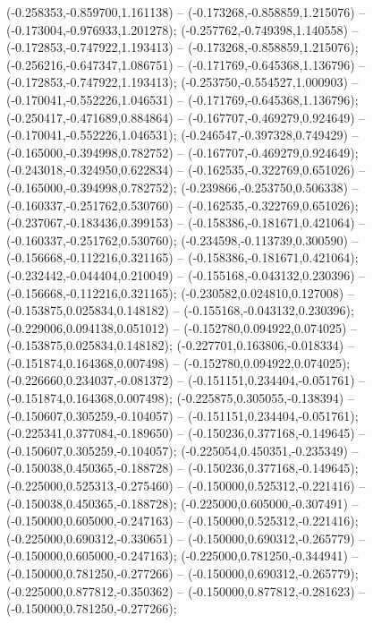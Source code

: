  (-0.258353,-0.859700,1.161138) -- (-0.173268,-0.858859,1.215076) -- (-0.173004,-0.976933,1.201278);
 (-0.257762,-0.749398,1.140558) -- (-0.172853,-0.747922,1.193413) -- (-0.173268,-0.858859,1.215076);
 (-0.256216,-0.647347,1.086751) -- (-0.171769,-0.645368,1.136796) -- (-0.172853,-0.747922,1.193413);
 (-0.253750,-0.554527,1.000903) -- (-0.170041,-0.552226,1.046531) -- (-0.171769,-0.645368,1.136796);
 (-0.250417,-0.471689,0.884864) -- (-0.167707,-0.469279,0.924649) -- (-0.170041,-0.552226,1.046531);
 (-0.246547,-0.397328,0.749429) -- (-0.165000,-0.394998,0.782752) -- (-0.167707,-0.469279,0.924649);
 (-0.243018,-0.324950,0.622834) -- (-0.162535,-0.322769,0.651026) -- (-0.165000,-0.394998,0.782752);
 (-0.239866,-0.253750,0.506338) -- (-0.160337,-0.251762,0.530760) -- (-0.162535,-0.322769,0.651026);
 (-0.237067,-0.183436,0.399153) -- (-0.158386,-0.181671,0.421064) -- (-0.160337,-0.251762,0.530760);
 (-0.234598,-0.113739,0.300590) -- (-0.156668,-0.112216,0.321165) -- (-0.158386,-0.181671,0.421064);
 (-0.232442,-0.044404,0.210049) -- (-0.155168,-0.043132,0.230396) -- (-0.156668,-0.112216,0.321165);
 (-0.230582,0.024810,0.127008) -- (-0.153875,0.025834,0.148182) -- (-0.155168,-0.043132,0.230396);
 (-0.229006,0.094138,0.051012) -- (-0.152780,0.094922,0.074025) -- (-0.153875,0.025834,0.148182);
 (-0.227701,0.163806,-0.018334) -- (-0.151874,0.164368,0.007498) -- (-0.152780,0.094922,0.074025);
 (-0.226660,0.234037,-0.081372) -- (-0.151151,0.234404,-0.051761) -- (-0.151874,0.164368,0.007498);
 (-0.225875,0.305055,-0.138394) -- (-0.150607,0.305259,-0.104057) -- (-0.151151,0.234404,-0.051761);
 (-0.225341,0.377084,-0.189650) -- (-0.150236,0.377168,-0.149645) -- (-0.150607,0.305259,-0.104057);
 (-0.225054,0.450351,-0.235349) -- (-0.150038,0.450365,-0.188728) -- (-0.150236,0.377168,-0.149645);
 (-0.225000,0.525313,-0.275460) -- (-0.150000,0.525312,-0.221416) -- (-0.150038,0.450365,-0.188728);
 (-0.225000,0.605000,-0.307491) -- (-0.150000,0.605000,-0.247163) -- (-0.150000,0.525312,-0.221416);
 (-0.225000,0.690312,-0.330651) -- (-0.150000,0.690312,-0.265779) -- (-0.150000,0.605000,-0.247163);
 (-0.225000,0.781250,-0.344941) -- (-0.150000,0.781250,-0.277266) -- (-0.150000,0.690312,-0.265779);
 (-0.225000,0.877812,-0.350362) -- (-0.150000,0.877812,-0.281623) -- (-0.150000,0.781250,-0.277266);
